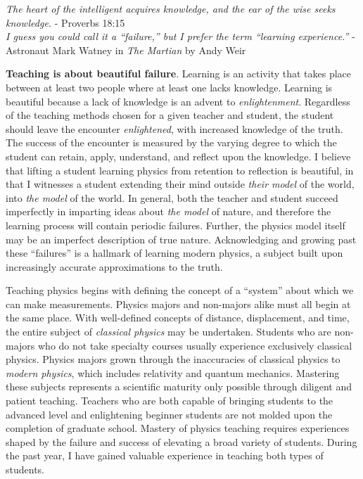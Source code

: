 \documentclass[../../main.tex]{subfiles}
\begin{document}
\epigraph{\textit{The heart of the intelligent acquires knowledge, and the ear of the wise seeks knowledge.} - Proverbs 18:15 \\ \vspace{0.1cm} \textit{I guess you could call it a ``failure,'' but I prefer the term ``learning experience.''} - Astronaut Mark Watney in \textit{The Martian} by Andy Weir}{}

\textbf{Teaching is about beautiful failure}.  Learning is an activity that takes place between at least two people where at least one lacks knowledge.  Learning is beautiful because a lack of knowledge is an advent to \textit{enlightenment}.  Regardless of the teaching methods chosen for a given teacher and student, the student should leave the encounter \textit{enlightened}, with increased knowledge of the truth.  The success of the encounter is measured by the varying degree to which the student can retain, apply, understand, and reflect upon the knowledge.  I believe that lifting a student learning physics from retention to reflection is beautiful, in that I witnesses a student extending their mind outside \textit{their model} of the world, into \textit{the model} of the world.  In general, both the teacher and student succeed imperfectly in imparting ideas about \textit{the model} of nature, and therefore the learning process will contain periodic failures.  Further, the physics model itself may be an imperfect description of true nature.  Acknowledging and growing past these ``failures'' is a hallmark of learning modern physics, a subject built upon increasingly accurate approximations to the truth. \\ \hspace{0.1cm}

Teaching physics begins with defining the concept of a ``system'' about which we can make measurements.  Physics majors and non-majors alike must all begin at the same place.  With well-defined concepts of distance, displacement, and time, the entire subject of \textit{classical physics} may be undertaken.  Students who are non-majors who do not take specialty courses usually experience exclusively classical physics.  Physics majors grown through the inaccuracies of classical physics to \textit{modern physics}, which includes relativity and quantum mechanics.  Mastering these subjects represents a scientific maturity only possible through diligent and patient teaching.  Teachers who are both capable of bringing students to the advanced level and enlightening beginner students are not molded upon the completion of graduate school.  Mastery of physics teaching requires experiences shaped by the failure and success of elevating a broad variety of students.  During the past year, I have gained valuable experience in teaching both types of students. \\ \hspace{0.1cm}
\end{document}
